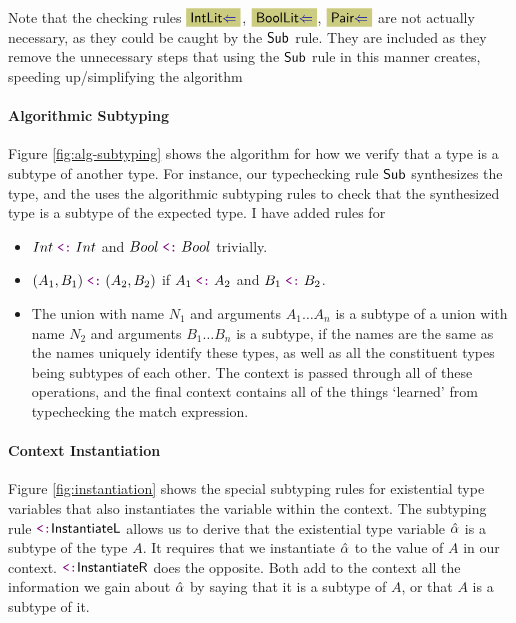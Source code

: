 Note that the checking rules $\MyTCRule{\Intcheckrulename}$, $\MyTCRule{\Boolcheckrulename}$, $\MyTCRule{\Paircheckrulename}$ are not actually necessary, as they could be caught by the $\text{\normalfont\textsf{Sub}}$ rule. They are included as they remove the unnecessary steps that using the $\text{\normalfont\textsf{Sub}}$ rule in this manner creates, speeding up/simplifying the algorithm 

\newpage

\newpage
% 

\paragraph{Algorithmic Subtyping}  Figure \ref{fig:alg-subtyping} shows the algorithm for how we verify that a type is a subtype of another type. For instance, our typechecking rule $\text{\normalfont\textsf{Sub}}$ synthesizes the type, and the uses the algorithmic subtyping rules to check that the synthesized type is a subtype of the expected type. I have added rules for
\begin{itemize}
    \item $Int \subtype Int$ and $Bool \subtype Bool$ trivially. 
    \item $(A_1, B_1) \subtype (A_2, B_2)$ if $A_1 \subtype A_2$ and $B_1 \subtype B_2$.
    \item The union with name $N_1$ and arguments $A_1 \dots A_n$ is a subtype of a union with name $N_2$ and arguments $B_1 \dots B_n$ is a subtype, if the names are the same as the names uniquely identify these types, as well as all the constituent types being subtypes of each other. The context is passed through all of these operations, and the final context contains all of the things `learned' from typechecking the match expression.
\end{itemize}

\paragraph{Context Instantiation} 
Figure \ref{fig:instantiation} shows the special subtyping rules for existential type variables that also instantiates the variable within the context. The subtyping rule $\SubInstL$ allows us to derive that the existential type variable $\hat{\alpha}$ is a subtype of the type $A$. It requires that we instantiate $\hat{\alpha}$ to the value of $A$ in our context. $\SubInstR$ does the opposite. Both add to the context all the information we gain about $\hat{\alpha}$ by saying that it is a subtype of $A$, or that $A$ is a subtype of it. 

